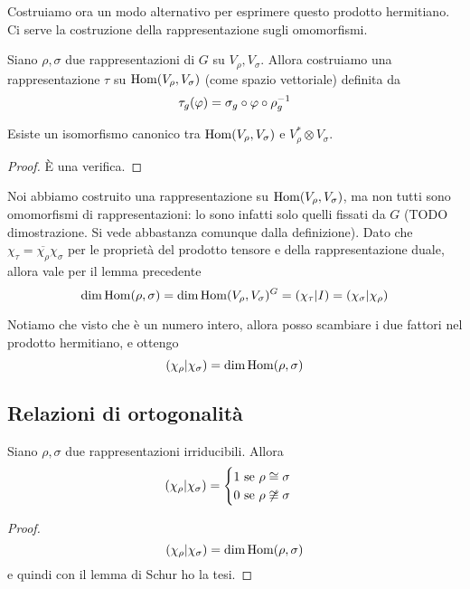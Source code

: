 \documentclass[a4paper,10pt,oneside]{math_article}
\renewcommand{\phi}{\varphi}
\newcommand{\herm}[2]{\left(#1 | #2\right)}
\newcommand{\id}{I}
\newcommand{\tensor}{\otimes}
\let\conj\overline
\begin{document}
    Costruiamo ora un modo alternativo per esprimere questo prodotto hermitiano. Ci serve la costruzione della rappresentazione sugli omomorfismi.
    
    \begin{mydef}
     Siano $\rho, \sigma$ due rappresentazioni di $G$ su $V_\rho,V_\sigma$. Allora costruiamo una rappresentazione $\tau$ su $\operatorname{Hom}(V_\rho,V_\sigma)$ (come spazio vettoriale) definita da 
     \[
      \tau_g (\phi) = \sigma_g \circ \phi \circ \rho_g\inv
     \]
    \end{mydef}
    
    \begin{myprop}
     Esiste un isomorfismo canonico tra $\operatorname{Hom} (V_\rho,V_\sigma)$ e $V_\rho^* \tensor V_\sigma$. 
    \end{myprop}
    
    \begin{proof}
     \`E una verifica.
    \end{proof}
    
    Noi abbiamo costruito una rappresentazione su $\operatorname{Hom}(V_\rho,V_\sigma)$, ma non tutti sono omomorfismi di rappresentazioni: lo sono infatti solo quelli fissati da $G$ (TODO dimostrazione. Si vede abbastanza comunque dalla definizione). Dato che $\chi_\tau = \conj{\chi_\rho}\chi_\sigma$ per le proprietà del prodotto tensore e della rappresentazione duale, allora vale per il lemma precedente
    \[
     \dim \Hom(\rho,\sigma) = \dim \Hom(V_\rho,V_\sigma)^G = \herm {\chi_\tau}\id = \herm{\chi_\sigma}{\chi_\rho}
    \]
    
    Notiamo che visto che è un numero intero, allora posso scambiare i due fattori nel prodotto hermitiano, e ottengo
    \[
     \herm{\chi_\rho}{\chi_\sigma} = \dim \Hom(\rho,\sigma)
    \]


    
    



   \subsection{Relazioni di ortogonalità}
    \begin{mytheorem}
     Siano $\rho,\sigma$ due rappresentazioni irriducibili. Allora
     \[
      \herm {\chi_\rho} {\chi_\sigma} = \begin{cases}
                           1 \mbox{ se } \rho \isom \sigma \\
                           0 \mbox{ se } \rho \not\isom \sigma
                          \end{cases}
     \]
    \end{mytheorem}
    \begin{proof}
     \[
      \herm {\chi_\rho}{\chi_\sigma}=\dim \Hom(\rho,\sigma)
     \]
     e quindi con il lemma di Schur ho la tesi.
    \end{proof}
    
\end{document}
